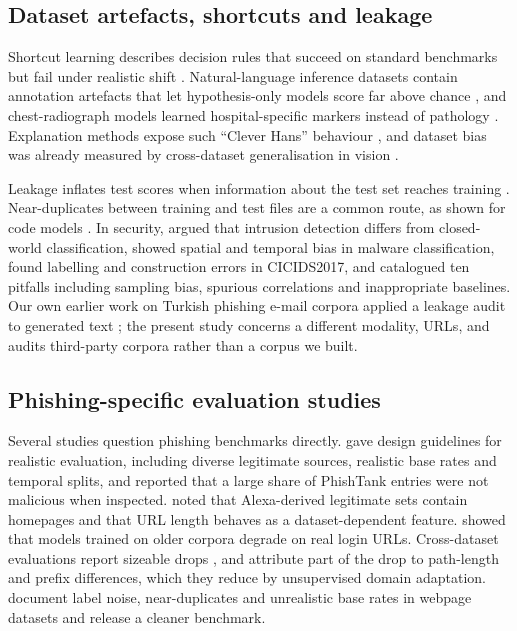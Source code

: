 \subsection{Dataset artefacts, shortcuts and leakage}
Shortcut learning describes decision rules that succeed on standard benchmarks but fail under realistic shift \citep{geirhos2020}. Natural-language inference datasets contain annotation artefacts that let hypothesis-only models score far above chance \citep{gururangan2018,mccoy2019}, and chest-radiograph models learned hospital-specific markers instead of pathology \citep{zech2018,degrave2021}. Explanation methods expose such ``Clever Hans'' behaviour \citep{lapuschkin2019}, and dataset bias was already measured by cross-dataset generalisation in vision \citep{torralba2011}.

Leakage inflates test scores when information about the test set reaches training \citep{kaufman2012,kapoor2023}. Near-duplicates between training and test files are a common route, as shown for code models \citep{allamanis2019}. In security, \citet{sommer2010} argued that intrusion detection differs from closed-world classification, \citet{pendlebury2019} showed spatial and temporal bias in malware classification, \citet{engelen2021} found labelling and construction errors in CICIDS2017, and \citet{arp2022,arp2024} catalogued ten pitfalls including sampling bias, spurious correlations and inappropriate baselines. Our own earlier work on Turkish phishing e-mail corpora applied a leakage audit to generated text \citep{cetlenbik2026}; the present study concerns a different modality, URLs, and audits third-party corpora rather than a corpus we built.

\subsection{Phishing-specific evaluation studies}
Several studies question phishing benchmarks directly. \citet{marchal2018} gave design guidelines for realistic evaluation, including diverse legitimate sources, realistic base rates and temporal splits, and reported that a large share of PhishTank entries were not malicious when inspected. \citet{shirazi2018} noted that Alexa-derived legitimate sets contain homepages and that URL length behaves as a dataset-dependent feature. \citet{sanchez2022} showed that models trained on older corpora degrade on real login URLs. Cross-dataset evaluations report sizeable drops \citep{mia2024,yi2026,ahamed2026}, and \citet{rashid2024} attribute part of the drop to path-length and prefix differences, which they reduce by unsupervised domain adaptation. \citet{dalton2025} document label noise, near-duplicates and unrealistic base rates in webpage datasets and release a cleaner benchmark.

